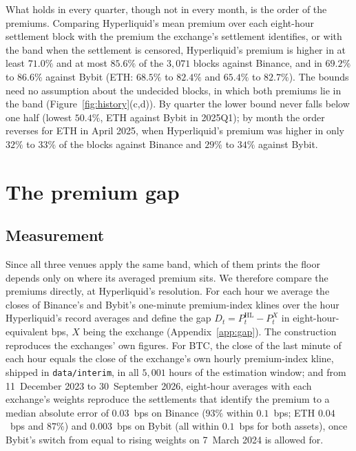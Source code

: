 \documentclass[10pt,a4paper]{article}
\begin{document}
What holds in every quarter, though not in every month, is the order of the premiums. Comparing Hyperliquid's mean premium over each eight-hour settlement block with the premium the exchange's settlement identifies, or with the band when the settlement is censored, Hyperliquid's premium is higher in at least $71.0\%$ and at most $85.6\%$ of the $3{,}071$ blocks against Binance, and in $69.2\%$ to $86.6\%$ against Bybit (ETH: $68.5\%$ to $82.4\%$ and $65.4\%$ to $82.7\%$). The bounds need no assumption about the undecided blocks, in which both premiums lie in the band (Figure~\ref{fig:history}(c,d)). By quarter the lower bound never falls below one half (lowest $50.4\%$, ETH against Bybit in 2025Q1); by month the order reverses for ETH in April 2025, when Hyperliquid's premium was higher in only $32\%$ to $33\%$ of the blocks against Binance and $29\%$ to $34\%$ against Bybit.

\section{The premium gap}\label{sec:gap}

\subsection{Measurement}

Since all three venues apply the same band, which of them prints the floor depends only on where its averaged premium sits. We therefore compare the premiums directly, at Hyperliquid's resolution. For each hour we average the closes of Binance's and Bybit's one-minute premium-index klines over the hour Hyperliquid's record averages and define the gap $D_t = P^{\text{HL}}_t - P^{X}_t$ in eight-hour-equivalent bps, $X$ being the exchange (Appendix~\ref{app:gap}). The construction reproduces the exchanges' own figures. For BTC, the close of the last minute of each hour equals the close of the exchange's own hourly premium-index kline, shipped in \texttt{data/interim}, in all $5{,}001$ hours of the estimation window; and from 11~December 2023 to 30~September 2026, eight-hour averages with each exchange's weights reproduce the settlements that identify the premium to a median absolute error of $0.03$~bps on Binance ($93\%$ within $0.1$~bps; ETH $0.04$~bps and $87\%$) and $0.003$~bps on Bybit (all within $0.1$~bps for both assets), once Bybit's switch from equal to rising weights on 7~March 2024 is allowed for.
\end{document}
